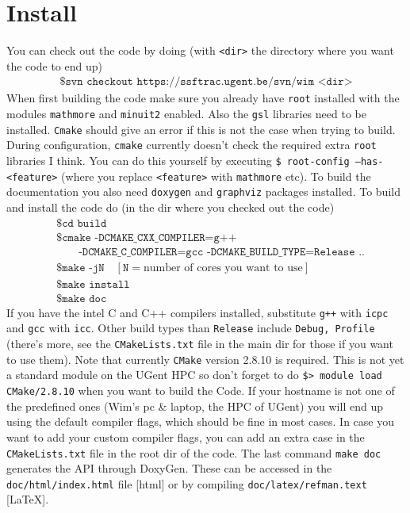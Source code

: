 \section{Install}
You can check out the code by doing (with \texttt{<dir>} the directory where 
you want the code to end up)
\begin{align*}
	\texttt{\$ svn checkout https://ssftrac.ugent.be/svn/wim <dir>}
\end{align*}
When first building the code make sure you already have \texttt{root} installed 
with the modules \texttt{mathmore} and 
\texttt{minuit2} enabled.  Also the \texttt{gsl} libraries need to be 
installed. \texttt{Cmake} should give an error if this is not the case when 
trying to build. During configuration, \texttt{cmake} currently doesn't check 
the required extra \texttt{root} libraries I think.  You can do this yourself 
by executing \texttt{\$ root-config --has-<feature>} (where you replace 
\texttt{<feature>} with \texttt{mathmore} etc). To build the documentation you 
also need \texttt{doxygen} and \texttt{graphviz} packages installed. To build 
and install the code do (in the dir where you checked 
out the code)
\begin{align*}
    & \texttt{\$ cd build} \\
	& \texttt{\$ cmake -DCMAKE\_CXX\_COMPILER=g++}\\
 &\qquad \texttt{-DCMAKE\_C\_COMPILER=gcc 
-DCMAKE\_BUILD\_TYPE=Release ..} \\
	& \texttt{\$ make -jN}\quad [\texttt{N}= \text{number of cores you want 
to use}]\\
	& \texttt{\$ make install } \\
	& \texttt{\$ make doc } 
\end{align*}
If you have the intel C and C++ compilers installed, substitute \texttt{g++} 
with \texttt{icpc} and \texttt{gcc} with \texttt{icc}.  Other build types than 
\texttt{Release} include \texttt{Debug, Profile} (there's more, see the 
\texttt{CMakeLists.txt} file in the main dir for those if you want to use 
them). 
Note that currently \texttt{CMake} version 2.8.10 is required. This is not yet a 
standard module on the UGent HPC so don't forget to do \texttt{\$> module load 
CMake/2.8.10} when you want to build the Code.  If your hostname is not one of 
the predefined ones (Wim's pc \& laptop, the HPC of UGent) you will end up 
using the default compiler flags, which should be fine in most cases.  In case 
you want to add your custom compiler flags, you can add an extra case in the 
\texttt{CMakeLists.txt} file in the root dir of the code.  The last command 
\texttt{make doc} generates the API through DoxyGen.  These can be accessed in 
the \texttt{doc/html/index.html} file [html] or by compiling 
\texttt{doc/latex/refman.text} [\LaTeX].

